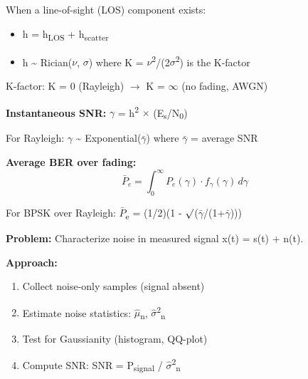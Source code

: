 When a line-of-sight (LOS) component exists:

\begin{itemize}
\tightlist
\item
  h = h\textsubscript{LOS} + h\textsubscript{scatter}
\item
  \textbar{}h\textbar{} \textasciitilde{} Rician(\ensuremath{\nu}, \ensuremath{\sigma}) where K = \ensuremath{\nu}\textsuperscript{2}/(2\ensuremath{\sigma}\textsuperscript{2}) is the K-factor
\end{itemize}

K-factor: K = 0 (Rayleigh) \ensuremath{\to} K = \ensuremath{\infty} (no fading, AWGN)


\textbf{Instantaneous SNR:} \ensuremath{\gamma} = \textbar{}h\textbar{}\textsuperscript{2} \ensuremath{\times} (E\textsubscript{s}/N\textsubscript{0})

For Rayleigh: \ensuremath{\gamma} \textasciitilde{} Exponential(\ensuremath{\bar{\gamma}}) where \ensuremath{\bar{\gamma}} = average SNR

\textbf{Average BER over fading:}\PSbr{}\[\bar{P}_e = \int_0^\infty P_e(\gamma) \cdot f_\gamma(\gamma) \, d\gamma\]

For BPSK over Rayleigh: \ensuremath{\bar{P}}\textsubscript{e} = (1/2)(1 - \ensuremath{\surd}(\ensuremath{\bar{\gamma}}/(1+\ensuremath{\bar{\gamma}})))



\textbf{Problem:} Characterize noise in measured signal x(t) = s(t) + n(t).

\textbf{Approach:}

\begin{enumerate}
\def\labelenumi{\arabic{enumi}.}
\tightlist
\item
  Collect noise-only samples (signal absent)
\item
  Estimate noise statistics: \ensuremath{\hat{\mu}}\textsubscript{n}, \ensuremath{\hat{\sigma}}\textsuperscript{2}\textsubscript{n}
\item
  Test for Gaussianity (histogram, QQ-plot)
\item
  Compute SNR: SNR = P\textsubscript{signal} / \ensuremath{\hat{\sigma}}\textsuperscript{2}\textsubscript{n}
\end{enumerate}


